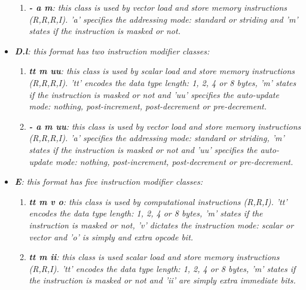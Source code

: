 \begin{itemize}
\begin{enumerate}
                        \item \textit{\textbf{- a m}: this class is used by vector load and store memory instructions (R,R,R,I). 'a' specifies the addressing mode: standard or striding and 'm' states if the instruction is masked or not.}

                    \end{enumerate}

                \item \textit{\textbf{D.l}: this format has two instruction modifier classes:}

                    \begin{enumerate}

                        \item \textit{\textbf{tt m uu}: this class is used by scalar load and store memory instructions (R,R,R,I). 'tt' encodes the data type length: 1, 2, 4 or 8 bytes, 'm' states if the instruction is masked or not and 'uu' specifies the auto-update mode: nothing, post-increment, post-decrement or pre-decrement.}

                        \item \textit{\textbf{- a m uu}: this class is used by vector load and store memory instructions (R,R,R,I). 'a' specifies the addressing mode: standard or striding, 'm' states if the instruction is masked or not and 'uu' specifies the auto-update mode: nothing, post-increment, post-decrement or pre-decrement.}

                    \end{enumerate}

                \item \textit{\textbf{E}: this format has five instruction modifier classes:}

                    \begin{enumerate}

                        \item \textit{\textbf{tt m v o}: this class is used by computational instructions (R,R,I). 'tt' encodes the data type length: 1, 2, 4 or 8 bytes, 'm' states if the instruction is masked or not, 'v' dictates the instruction mode: scalar or vector and 'o' is simply and extra opcode bit.}

                        \item \textit{\textbf{tt m ii}: this class is used scalar load and store memory instructions (R,R,I). 'tt' encodes the data type length: 1, 2, 4 or 8 bytes, 'm' states if the instruction is masked or not and 'ii' are simply extra immediate bits.}


\end{enumerate}
\end{itemize}
